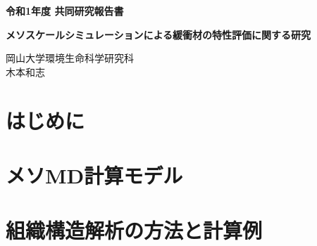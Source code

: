 ﻿\documentclass[11pt,a4j]{jarticle}
\newlength{\minitwocolumn}
\begin{document}
\newcommand{\fat}[1]{\mbox{\boldmath $#1$}}
\newcommand{\D}{\partial}
\newcommand{\w}{\omega}
\newcommand{\ga}{\alpha}
\newcommand{\gb}{\beta}
\newcommand{\gx}{\xi}
\newcommand{\gz}{\zeta}
\newcommand{\vhat}[1]{\hat{\fat{#1}}}
\newcommand{\spc}{\vspace{0.7\baselineskip}}
\newcommand{\halfspc}{\vspace{0.3\baselineskip}}

\pagestyle{empty}
\newcommand{\twofig}[2]
 {
   \begin{figure}[h]
     \begin{minipage}[t]{\minitwocolumn}
         \begin{center}   #1
         \end{center}
     \end{minipage}
         \hspace{\columnsep}
     \begin{minipage}[t]{\minitwocolumn}
         \begin{center} #2
         \end{center}
     \end{minipage}
   \end{figure}
 }
\begin{center}
{\Large \bf 令和1年度 共同研究報告書}
\end{center}
\vspace{2mm}
\begin{center}
{\LARGE \bf 
メソスケールシミュレーションによる緩衝材の特性評価に関する研究} 
\end{center}
\begin{center}
岡山大学環境生命科学研究科\\
木本和志
\end{center}
\vspace{10mm}
\section{はじめに}

\section{メソMD計算モデル}

\section{組織構造解析の方法と計算例}

\end{document}
